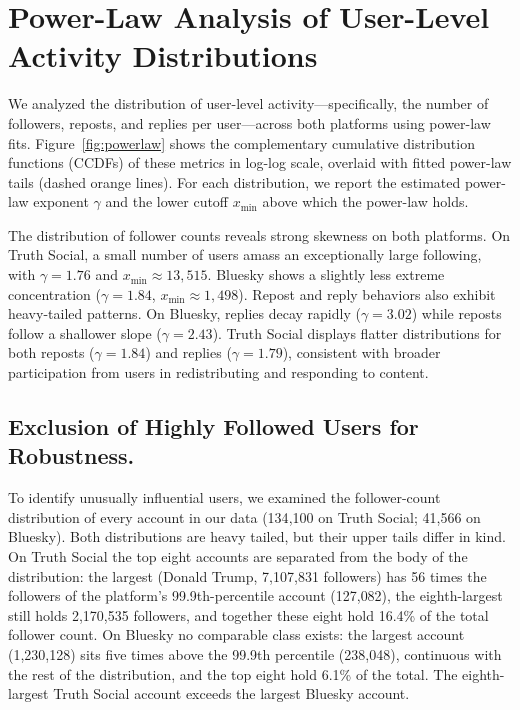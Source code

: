 \documentclass[letterpaper]{article} %
\newcommand{\rev}[1]{{\color{blue}#1}}
\begin{document}
\appendix

\section{Power-Law Analysis of User-Level Activity Distributions}
\label{app:powerlaw}
We analyzed the distribution of user-level activity—specifically, the number of followers, reposts, and replies per user—across both platforms using power-law fits. Figure~\ref{fig:powerlaw} shows the complementary cumulative distribution functions (CCDFs) of these metrics in log-log scale, overlaid with fitted power-law tails (dashed orange lines). For each distribution, we report the estimated power-law exponent $\gamma$ and the lower cutoff $x_{\min}$ above which the power-law holds.

The distribution of follower counts reveals strong skewness on both platforms. On Truth Social, a small number of users amass an exceptionally large following, with $\gamma = 1.76$ and $x_{\min} \approx 13{,}515$. Bluesky shows a slightly less extreme concentration ($\gamma = 1.84$, $x_{\min} \approx 1{,}498$). Repost and reply behaviors also exhibit heavy-tailed patterns. On Bluesky, replies decay rapidly ($\gamma = 3.02$) while reposts follow a shallower slope ($\gamma = 2.43$). Truth Social displays flatter distributions for both reposts ($\gamma = 1.84$) and replies ($\gamma = 1.79$), consistent with broader participation from users in redistributing and responding to content.

\subsection*{Exclusion of Highly Followed Users for Robustness.}
To identify unusually influential users, we examined the follower-count distribution of every account in our data \rev{(134{,}100 on Truth Social; 41{,}566 on Bluesky). Both distributions are heavy tailed, but their upper tails differ in kind. On Truth Social the top eight accounts are separated from the body of the distribution: the largest (Donald Trump, 7{,}107{,}831 followers) has 56 times the followers of the platform's 99.9th-percentile account (127{,}082), the eighth-largest still holds 2{,}170{,}535 followers, and together these eight hold 16.4\% of the total follower count. On Bluesky no comparable class exists: the largest account (1{,}230{,}128) sits five times above the 99.9th percentile (238{,}048), continuous with the rest of the distribution, and the top eight hold 6.1\% of the total. The eighth-largest Truth Social account exceeds the largest Bluesky account.}
\end{document}
